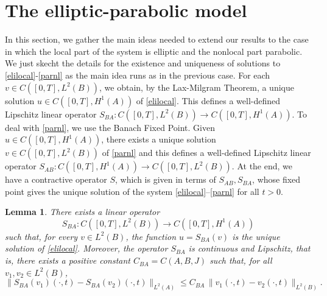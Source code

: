 \documentclass[reqno]{amsart}
\numberwithin{equation}{section}
\newtheorem{lemma}[theorem]{Lemma}
\begin{document}
\section{The elliptic-parabolic model} \label{sect-2-model}

In this section, we gather the main ideas needed to extend our results to the case in which the local part of the system is elliptic and the nonlocal part parabolic. We just 
skecht the details for the existence and uniqueness of solutions to \eqref{elilocal}-\eqref{parnl} as the main idea runs as in the previous case. 
For each $v\in C([0,T],L^2(B))$, we obtain, by the Lax-Milgram Theorem, a unique solution $u\in C([0,T],H^1(A))$ of \eqref{elilocal}. This defines a well-defined Lipschitz linear operator $S_{BA}:C([0,T],L^2(B))\to C([0,T],H^1(A))$. To deal with \eqref{parnl}, we use the Banach Fixed Point. Given $u\in C([0,T],H^1(A))$, there exists a unique solution $v\in C([0,T],L^2(B))$ of \eqref{parnl} and this defines a well-defined Lipschitz linear operator $S_{AB}:C([0,T],H^1(A))\to C([0,T],L^2(B))$. At the end, we have a contractive operator $S$, which is given in terms of $S_{AB},S_{BA}$, whose fixed point gives the unique solution of the system \eqref{elilocal}--\eqref{parnl} for all $t>0$.





\begin{lemma}\label{EUlocaleli}
There exists a linear operator
\[
S_{BA}:C([0,T],L^2(B))\to C([0,T],H^1(A))
\]
such that, for every $v\in L^2(B)$, the function $u=S_{BA}(v)$ is the unique
solution of \eqref{elilocal}. Moreover, the operator $S_{BA}$ is continuous and
Lipschitz, that is, there exists a positive constant
$C_{BA}=C(A,B,J)$ such that, for all $v_1,v_2\in L^2(B)$,
\begin{equation}\label{uvnorme-p}
\|S_{BA}(v_1)(\cdot, t)-S_{BA}(v_2)(\cdot, t)\|_{L^2(A)}
\le
C_{BA}\,\|v_1(\cdot, t)-v_2(\cdot, t)\|_{L^2(B)}.
\end{equation}
\end{lemma}
\end{document}
